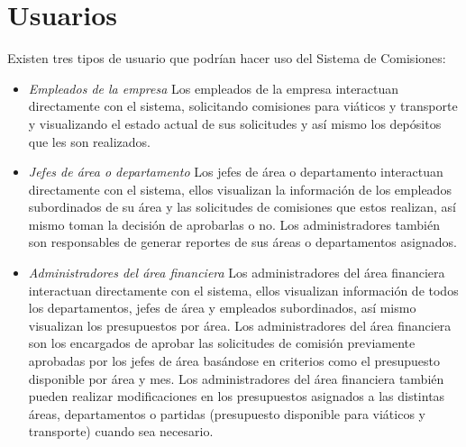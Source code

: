 \section{Usuarios}

Existen tres tipos de usuario que podrían hacer uso del Sistema de Comisiones:
\begin{itemize} 
		\item \textit{Empleados de la empresa} Los empleados de la empresa interactuan directamente con el sistema, solicitando comisiones para viáticos y transporte y visualizando el estado actual de sus solicitudes y así mismo los depósitos que les son realizados.
		
		\item \textit{Jefes de área o departamento} Los jefes de área o departamento interactuan directamente con el sistema, ellos visualizan la información de los empleados subordinados de su área y las solicitudes de comisiones que estos realizan, así mismo toman la decisión de aprobarlas o no. Los administradores también son responsables de generar reportes de sus áreas o departamentos asignados.
		
		\item\textit{Administradores del área financiera} Los administradores del área financiera interactuan directamente con el sistema, ellos visualizan información de todos los departamentos, jefes de área y empleados subordinados, así mismo visualizan los presupuestos por área. Los administradores del área financiera son los encargados de aprobar las solicitudes de comisión previamente aprobadas por los jefes de área basándose en criterios como el presupuesto disponible por área y mes. Los administradores del área financiera también pueden realizar modificaciones en los presupuestos asignados a las distintas áreas, departamentos o partidas (presupuesto disponible para viáticos y transporte) cuando sea necesario.
\end{itemize}